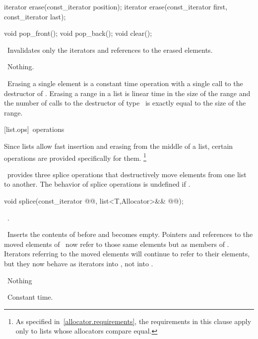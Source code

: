 \documentclass[american,twoside]{book}
\begin{document}
%
\begin{itemdecl}
iterator erase(const_iterator position);
iterator erase(const_iterator first, const_iterator last);

void pop_front();
void pop_back();
void clear();
\end{itemdecl}

\begin{itemdescr}
\pnum
\effects\ 
Invalidates only the iterators and references to the erased elements.

\pnum
\throws\ 
Nothing.

\pnum
\complexity\ 
Erasing a single element is a constant time operation with a single call to the destructor of
.
Erasing a range in a list is linear time in the
size of the range and the number of calls to the destructor of type
\tcode{T}\
is exactly equal to the size of the range.
\end{itemdescr}

\rSec3[list.ops]{\ operations}

\pnum
Since lists allow fast insertion and erasing from the middle of a list, certain operations are provided
specifically for them.%
\footnote{As specified in~\ref{allocator.requirements}, the requirements
in this clause apply only to lists whose allocators compare equal.
}

\pnum
\tcode{list}\
provides three splice operations that destructively move elements from one list to another. The behavior of splice operations is undefined if .

%
\begin{itemdecl}
void splice(const_iterator @@, list<T,Allocator>&& @@);
\end{itemdecl}

\begin{itemdescr}
\pnum
\requires\ 
\tcode{\&\farg{x} != this}.

\pnum
\effects\ 
Inserts the contents of
before
\tcode{position}
and
becomes empty.
Pointers and references to the moved elements of
\tcode{x}\
now refer to those same elements but as members of
.
Iterators referring to the moved elements will continue to refer to their
elements, but they now behave as iterators into
,
not into
\tcode{x}.

\pnum
\throws\ 
Nothing

\pnum
\complexity\ 
Constant time.
\end{itemdescr}
\end{document}
